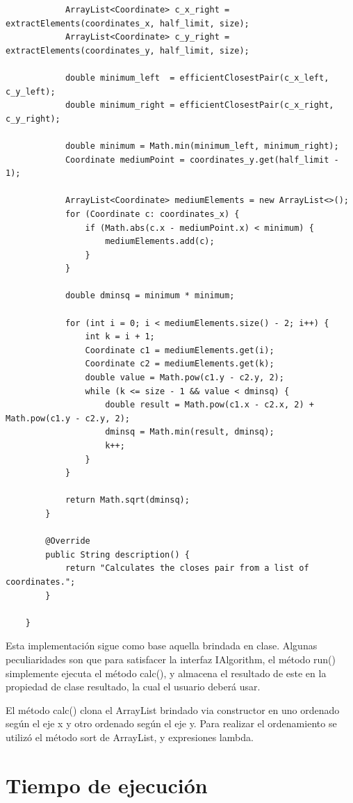 \documentclass[paper=a4, fontsize=11pt]{scrartcl} %
\numberwithin{equation}{section} %
\numberwithin{figure}{section} %
\numberwithin{table}{section} %
\begin{document}
\begin{lstlisting}
            ArrayList<Coordinate> c_x_right = extractElements(coordinates_x, half_limit, size);
            ArrayList<Coordinate> c_y_right = extractElements(coordinates_y, half_limit, size);

            double minimum_left  = efficientClosestPair(c_x_left, c_y_left);
            double minimum_right = efficientClosestPair(c_x_right, c_y_right);

            double minimum = Math.min(minimum_left, minimum_right);
            Coordinate mediumPoint = coordinates_y.get(half_limit - 1);

            ArrayList<Coordinate> mediumElements = new ArrayList<>();
            for (Coordinate c: coordinates_x) {
                if (Math.abs(c.x - mediumPoint.x) < minimum) {
                    mediumElements.add(c);
                }
            }

            double dminsq = minimum * minimum;

            for (int i = 0; i < mediumElements.size() - 2; i++) {
                int k = i + 1;
                Coordinate c1 = mediumElements.get(i);
                Coordinate c2 = mediumElements.get(k);
                double value = Math.pow(c1.y - c2.y, 2);
                while (k <= size - 1 && value < dminsq) {
                    double result = Math.pow(c1.x - c2.x, 2) + Math.pow(c1.y - c2.y, 2);
                    dminsq = Math.min(result, dminsq);
                    k++;
                }
            }

            return Math.sqrt(dminsq);
        }

        @Override
        public String description() {
            return "Calculates the closes pair from a list of coordinates.";
        }

    }

\end{lstlisting}

    Esta implementación sigue como base aquella brindada en clase. Algunas peculiaridades son que
    para satisfacer la interfaz IAlgorithm, el método run() simplemente ejecuta el método calc(),
    y almacena el resultado de este en la propiedad de clase resultado, la cual el usuario deberá
    usar.

    El método calc() clona el ArrayList brindado via constructor en uno ordenado según el eje x y
    otro ordenado según el eje y. Para realizar el ordenamiento se utilizó el método sort de
    ArrayList, y expresiones lambda.

\section{Tiempo de ejecución}\label{sec:tiempos-de-ejecución}
\end{document}
